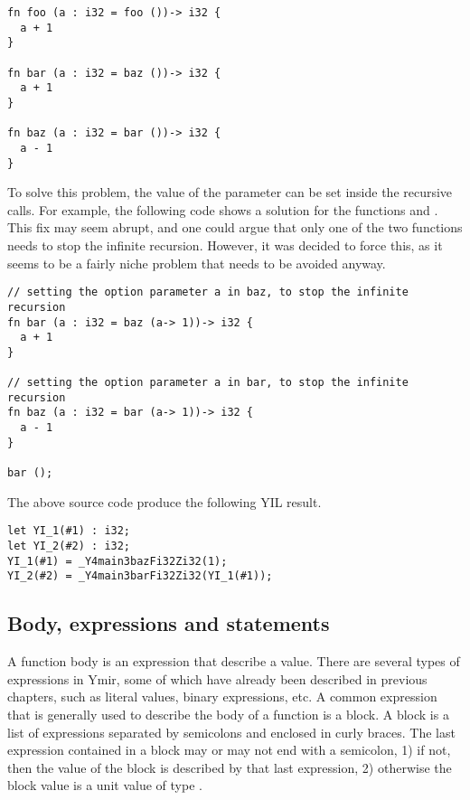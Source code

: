 \begin{lstlisting}[style=coloredverbatim]
fn foo (a : i32 = foo ())-> i32 {
  a + 1
}

fn bar (a : i32 = baz ())-> i32 {
  a + 1
}

fn baz (a : i32 = bar ())-> i32 {
  a - 1
}
\end{lstlisting}

To solve this problem, the value of the parameter  can be set inside
the recursive calls. For example, the following code shows a solution for the
functions  and . This fix may seem abrupt, and one could
argue that only one of the two functions needs to stop the infinite recursion.
However, it was decided to force this, as it seems to be a fairly niche problem
that needs to be avoided anyway.

\begin{lstlisting}[style=coloredverbatim]
// setting the option parameter a in baz, to stop the infinite recursion
fn bar (a : i32 = baz (a-> 1))-> i32 {
  a + 1
}

// setting the option parameter a in bar, to stop the infinite recursion
fn baz (a : i32 = bar (a-> 1))-> i32 {
  a - 1
}

bar ();
\end{lstlisting}

The above source code produce the following YIL result.

\begin{lstlisting}[style=lyilVerb]
let YI_1(#1) : i32;
let YI_2(#2) : i32;
YI_1(#1) = _Y4main3bazFi32Zi32(1);
YI_2(#2) = _Y4main3barFi32Zi32(YI_1(#1));
\end{lstlisting}

\subsection {Body, expressions and statements}
\label{sec:function_body}

A function body is an expression that describe a value. There are several types
of expressions in Ymir, some of which have already been described in previous
chapters, such as literal values, binary expressions, etc. A common expression
that is generally used to describe the body of a function is a block. A block is
a list of expressions separated by semicolons and enclosed in curly braces. The
last expression contained in a block may or may not end with a semicolon, 1) if
not, then the value of the block is described by that last expression, 2)
otherwise the block value is a unit value of type .

